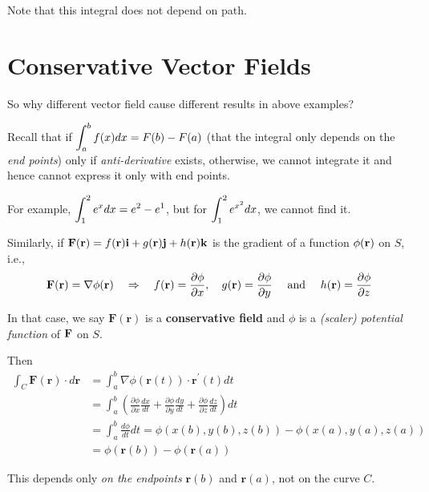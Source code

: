 \documentclass[11pt, a4paper]{MATH2023}
\newcommand{\ii}{{\bf i}}
\newcommand{\jj}{{\bf j}}
\newcommand{\kk}{{\bf k}}
\newcommand{\rr}{{\bf r}}
\newcommand{\FF}{{\bf F}}
\begin{document}
\begin{spacing}{1.3}
    {\blue Note that this integral does not depend on path.}

    \newpage
    \section{Conservative Vector Fields}

    {\blue So why different vector field cause different results in above examples?}
    
    Recall that if $\displaystyle \int_a^b f(x) dx=F(b)-F(a)$ (that the integral only depends on the 
    {\it end points}) only if {\it anti-derivative } exists, otherwise, we cannot integrate it
    and hence cannot express it only with end points.

    For example, $\displaystyle \int_1^2 e^x dx = e^2-e^1$, but for $\displaystyle \int_1^2 e^{x^2} dx$,
    we cannot find it.

    \vspace{0.3in}
    Similarly, if $\FF(\rr)=f(\rr)\ii +g(\rr)\jj +h(\rr)\kk$ is the gradient of a function 
    $\phi(\rr)$ on $S$, i.e.,
    $$\FF(\rr)=\nabla \phi(\mathbf{r}) \quad \Rightarrow \quad 
    f(\mathbf{r})=\frac{\partial \phi}{\partial x}, \quad g(\mathbf{r})=\frac{\partial \phi}{\partial y} \quad 
    \text { and } \quad h(\mathbf{r})=\frac{\partial \phi}{\partial z}$$

    In that case, we say $\mathbf{F}(\mathbf{r})$ is a {\bf conservative field} and $\phi$ is a 
    {\it (scaler) potential function} of $\FF$ on $S$.
    
    Then
    $$\begin{aligned}
    \int_{C} \mathbf{F}(\mathbf{r}) \cdot d \mathbf{r} &=\int_{a}^{b} \nabla \phi(\mathbf{r}(t)) \cdot \mathbf{r}^{\prime}(t) d t \\
    &=\int_{a}^{b}\left(\frac{\partial \phi}{\partial x} \frac{d x}{d t}+\frac{\partial \phi}{\partial y} \frac{d y}{d t}+\frac{\partial \phi}{\partial z} \frac{d z}{d t}\right) d t \\
    &=\int_{a}^{b} \frac{d \phi}{d t} d t=\phi(x(b), y(b), z(b))-\phi(x(a), y(a), z(a)) \\
    &=\phi(\mathbf{r}(b))-\phi(\mathbf{r}(a))
    \end{aligned}$$

    This depends only {\it on the endpoints} $\mathbf{r}(b)$ and $\mathbf{r}(a)$, not on the curve $C.$


\end{spacing}
\end{document}
